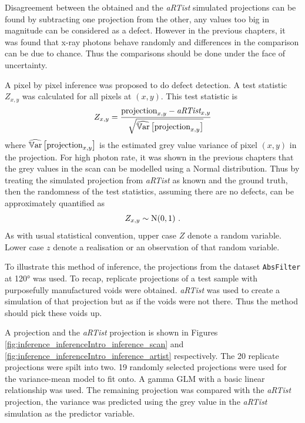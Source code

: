 Disagreement between the obtained and the \emph{aRTist} simulated projections can be found by subtracting one projection from the other, any values too big in magnitude can be considered as a defect. However in the previous chapters, it was found that x-ray photons behave randomly and differences in the comparison can be due to chance. Thus the comparisons should be done under the face of uncertainty.

A pixel by pixel inference was proposed to do defect detection. A test statistic $Z_{x,y}$ was calculated for all pixels at $(x,y)$. This test statistic is
\begin{equation}
  Z_{x,y} = 
  \dfrac{
    \text{projection}_{x,y} - \emph{aRTist}_{x,y}
  }
  {
    \sqrt{\widehat{\operatorname{\mathbb{V}ar}}\left[\text{projection}_{x,y}\right]}
  }
\end{equation}
where $\widehat{\operatorname{\mathbb{V}ar}}\left[\text{projection}_{x,y}\right]$ is the estimated grey value variance of pixel $(x,y)$ in the projection. For high photon rate, it was shown in the previous chapters that the grey values in the scan can be modelled using a Normal distribution. Thus by treating the simulated projection from \emph{aRTist} as known and the ground truth, then the randomness of the test statistics, assuming there are no defects, can be approximately quantified as
\begin{equation}
Z_{x,y}\sim \normal(0,1) \ .
\end{equation}
As with usual statistical convention, upper case $Z$ denote a random variable. Lower case $z$ denote a realisation or an observation of that random variable.

To illustrate this method of inference, the projections from the dataset \texttt{AbsFilter} at \ang{120} was used. To recap, replicate projections of a test sample with purposefully manufactured voids were obtained. \emph{aRTist} was used to create a simulation of that projection but as if the voids were not there. Thus the method should pick these voids up.

A projection and the \emph{aRTist} projection is shown in Figures \ref{fig:inference_inferenceIntro_inference_scan} and \ref{fig:inference_inferenceIntro_inference_artist} respectively. The 20 replicate projections were spilt into two. 19 randomly selected projections were used for the variance-mean model to fit onto. A gamma GLM with a basic linear relationship was used. The remaining projection was compared with the \emph{aRTist} projection, the variance was predicted using the grey value in the \emph{aRTist} simulation as the predictor variable.

